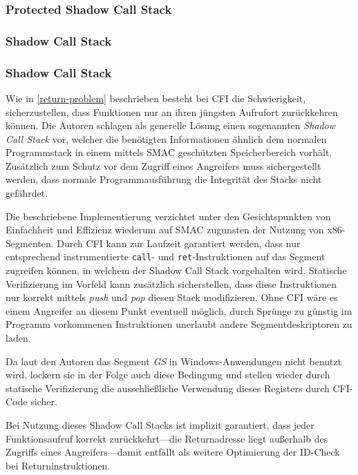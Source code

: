 \documentclass[11pt]{article}
\begin{document}
\subsubsection{Protected Shadow Call Stack}
\subsubsection{Shadow Call Stack}
\subsubsection{Shadow Call Stack}

\label{return-solution}

Wie in \ref{return-problem} beschrieben besteht bei CFI die Schwierigkeit,
sicherzustellen, dass Funktionen nur an ihren jüngsten Aufrufort zurückkehren
können. Die Autoren schlagen als generelle Lösung einen sogenannten
\emph{Shadow Call Stack} vor, welcher die benötigten Informationen ähnlich dem
normalen Programmstack in einem mittels SMAC geschützten Speicherbereich
vorhält. Zusätzlich zum Schutz vor dem Zugriff eines Angreifers muss
sichergestellt werden, dass normale Programmausführung die Integrität des
Stacks nicht gefährdet.


Die beschriebene Implementierung verzichtet unter den Gesichtspunkten von
Einfachheit und Effizienz wiederum auf SMAC zugunsten der Nutzung von
x86-Segmenten. Durch CFI kann zur Laufzeit garantiert werden, dass nur
entsprechend instrumentierte \texttt{call}- und \texttt{ret}-Instruktionen auf
das Segment zugreifen können, in welchem der Shadow Call Stack vorgehalten
wird. Statische Verifizierung im Vorfeld kann zusätzlich sicherstellen, dass
diese Instruktionen nur korrekt mittels \emph{push} und \emph{pop} diesen Stack
modifizieren. Ohne CFI wäre es einem Angreifer an diesem Punkt eventuell
möglich, durch Sprünge zu günstig im Programm vorkommenen Instruktionen
unerlaubt andere Segmentdeskriptoren zu laden.

Da laut den Autoren das Segment \emph{GS} in Windows-Anwendungen nicht benutzt
wird, lockern sie in der Folge auch diese Bedingung und stellen wieder durch
statische Verifizierung die ausschließliche Verwendung dieses Registers durch
CFI-Code sicher.

Bei Nutzung dieses Shadow Call Stacks ist implizit garantiert, dass jeder
Funktionsaufruf korrekt zurückkehrt—die Returnadresse liegt außerhalb des
Zugriffs eines Angreifers—damit entfällt als weitere Optimierung der ID-Check
bei Returninstruktionen.
\end{document}
